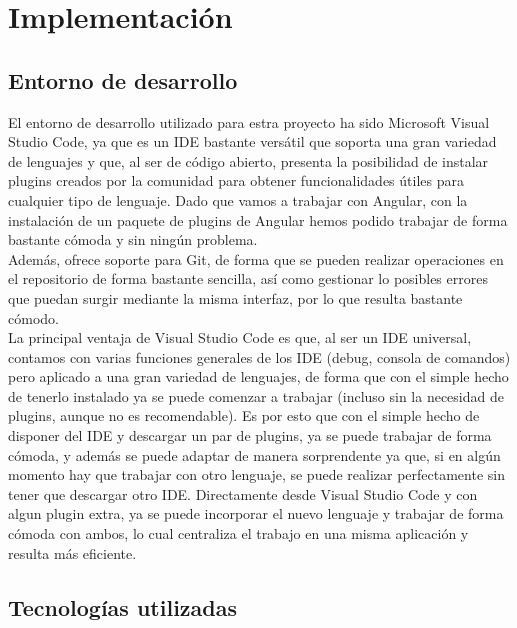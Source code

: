\chapter{Implementaci\'on}\label{implementacion}

\section{Entorno de desarrollo}

El entorno de desarrollo utilizado para estra proyecto ha sido Microsoft Visual Studio Code, ya que es un IDE bastante versátil que soporta una gran variedad de lenguajes y que, al ser de código abierto, presenta la posibilidad de instalar plugins creados por la comunidad para obtener funcionalidades útiles para cualquier tipo de lenguaje. Dado que vamos a trabajar con Angular, con la instalación de un paquete de plugins de Angular hemos podido trabajar de forma bastante cómoda y sin ningún problema.\\

Además, ofrece soporte para Git, de forma que se pueden realizar operaciones en el repositorio de forma bastante sencilla, así como gestionar lo posibles errores que puedan surgir mediante la misma interfaz, por lo que resulta bastante cómodo.\\

La principal ventaja de Visual Studio Code es que, al ser un IDE universal, contamos con varias funciones generales de los IDE (debug, consola de comandos) pero aplicado a una gran variedad de lenguajes, de forma que con el simple hecho de tenerlo instalado ya se puede comenzar a trabajar (incluso sin la necesidad de plugins, aunque no es recomendable). Es por esto que con el simple hecho de disponer del IDE y descargar un par de plugins, ya se puede trabajar de forma cómoda, y además se puede adaptar de manera sorprendente ya que, si en algún momento hay que trabajar con otro lenguaje, se puede realizar perfectamente sin tener que descargar otro IDE. Directamente desde Visual Studio Code y con algun plugin extra, ya se puede incorporar el nuevo lenguaje y trabajar de forma cómoda con ambos, lo cual centraliza el trabajo en una misma aplicación y resulta más eficiente.\\

\section{Tecnolog\'ias utilizadas}

